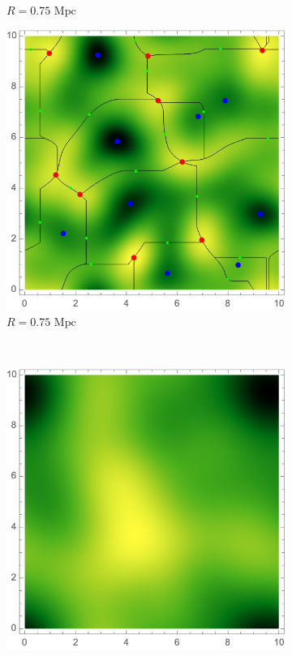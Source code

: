 \documentclass[a4paper, 11pt]{article}
\begin{document}
\begin{figure}
\begin{subfigure}[b]{0.3\textwidth}
\caption{$R=0.75\text{ Mpc}$}
\label{fig:}
\end{subfigure}
\begin{subfigure}[b]{0.3\textwidth}
\includegraphics[width=\textwidth]{ScaleR=075_delta}
\caption{$R=0.75\text{ Mpc}$}
\label{fig:}
\end{subfigure}\\
\begin{subfigure}[b]{0.3\textwidth}
\includegraphics[width=\textwidth]{ScaleR=100_Psi}

\end{subfigure}
\end{figure}
\end{document}
